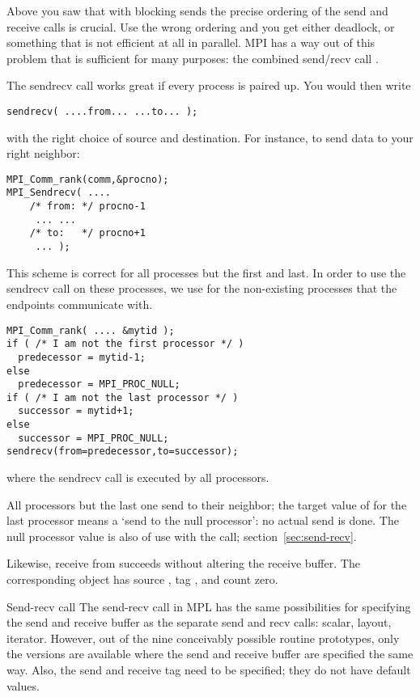 Above you saw that with blocking sends the precise ordering of the
send and receive calls is crucial. Use the wrong ordering and you get
either deadlock, or something that is not efficient at all in
parallel. MPI has a way out of this problem that is sufficient for
many purposes: the combined send/recv call .

The sendrecv call works great if every process is paired up.
You would then write
\begin{lstlisting}
sendrecv( ....from... ...to... );
\end{lstlisting}
with the right choice of source and destination. For instance, to send
data to your right neighbor:
\begin{lstlisting}
MPI_Comm_rank(comm,&procno);
MPI_Sendrecv( .... 
    /* from: */ procno-1
     ... ... 
    /* to:   */ procno+1
     ... );
\end{lstlisting}
This scheme is correct for all processes but the first and last. 
In order to use the sendrecv call on these processes,
we use  for the non-existing
processes that the endpoints communicate with.
\begin{lstlisting}
MPI_Comm_rank( .... &mytid );
if ( /* I am not the first processor */ )
  predecessor = mytid-1;
else
  predecessor = MPI_PROC_NULL;
if ( /* I am not the last processor */ )
  successor = mytid+1;
else
  successor = MPI_PROC_NULL;
sendrecv(from=predecessor,to=successor);
\end{lstlisting}
where the sendrecv call is executed by all processors.

All processors but the last one send to their neighbor; the target
value of  for
the last processor means a `send to the null processor': no actual
send is done. 
The null processor value is also of use with the
 call; section~\ref{sec:send-recv}.

Likewise, receive from  succeeds without
altering the receive buffer.  The corresponding
 object has source
, tag , and
count zero.

\begin{mplnote}{Send-recv call}
  The send-recv call in \ac{MPL} has the same possibilities
  for specifying the send and receive buffer as the separate send and recv calls:
  scalar, layout, iterator. However, out of the nine conceivably possible
  routine prototypes, only the versions are available where the send and receive buffer
  are specified the same way.
  Also, the send and receive tag need to be specified; they do not have default values.

\end{mplnote}

